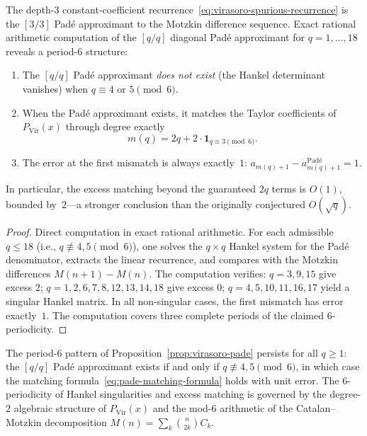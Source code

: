 \begin{proposition}
\label{prop:virasoro-pade}
The depth-$3$ constant-coefficient
recurrence~\eqref{eq:virasoro-spurious-recurrence} is the $[3/3]$
Pad\'e approximant to the Motzkin difference sequence.  Exact rational
arithmetic computation of the $[q/q]$ diagonal Pad\'e approximant for
$q = 1, \ldots, 18$ reveals a period-$6$ structure:
\begin{enumerate}[label=\textup{(\roman*)}]
\item The $[q/q]$ Pad\'e approximant \emph{does not exist}
  \textup{(}the Hankel determinant vanishes\textup{)} when
  $q \equiv 4$ or $5 \pmod{6}$.
\item When the Pad\'e approximant exists, it matches the Taylor
  coefficients of $P_{\mathrm{Vir}}(x)$ through degree exactly
  \begin{equation}\label{eq:pade-matching-formula}
    m(q) = 2q + 2 \cdot \mathbf{1}_{q \equiv 3 \pmod{6}}.
  \end{equation}
\item The error at the first mismatch is always exactly~$1$:
  $a_{m(q)+1} - a_{m(q)+1}^{\text{Pad\'e}} = 1$.
\end{enumerate}
In particular, the excess matching beyond the guaranteed $2q$ terms is
$O(1)$, bounded by~$2$---a stronger conclusion than the originally
conjectured $O(\sqrt{q})$.
\end{proposition}

\begin{proof}
Direct computation in exact rational arithmetic.  For each admissible
$q \leq 18$ (i.e., $q \not\equiv 4, 5 \pmod{6}$), one solves the
$q \times q$ Hankel system for the Pad\'e denominator, extracts the
linear recurrence, and compares with the Motzkin differences $M(n+1) -
M(n)$.  The computation verifies: $q = 3, 9, 15$ give excess $2$; $q
= 1, 2, 6, 7, 8, 12, 13, 14, 18$ give excess $0$; $q = 4, 5, 10,
11, 16, 17$ yield a singular Hankel matrix.  In all non-singular
cases, the first mismatch has error exactly~$1$.  The computation
covers three complete periods of the claimed $6$-periodicity.
\end{proof}

\begin{conjecture}
\label{conj:virasoro-pade-periodic}
The period-$6$ pattern of
Proposition~\textup{\ref{prop:virasoro-pade}} persists for all
$q \geq 1$: the $[q/q]$ Pad\'e approximant exists if and only if
$q \not\equiv 4, 5 \pmod{6}$, in which case the matching
formula~\eqref{eq:pade-matching-formula} holds with unit error.  The
$6$-periodicity of Hankel singularities and excess matching is
governed by the degree-$2$ algebraic structure of $P_{\mathrm{Vir}}(x)$
and the mod-$6$ arithmetic of the Catalan--Motzkin decomposition
$M(n) = \sum_{k} \binom{n}{2k} C_k$.
\end{conjecture}

